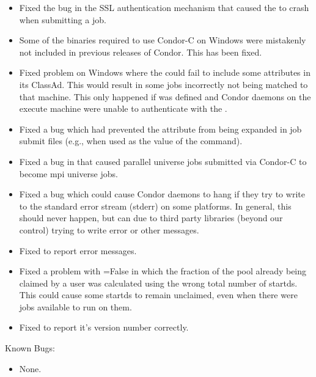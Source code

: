 \begin{itemize}
\item Fixed the bug in the SSL authentication mechanism that caused the
 to crash when submitting a job.

\item Some of the binaries required to use Condor-C on Windows were
mistakenly not included in previous releases of Condor. This has been
fixed.

\item Fixed problem on Windows where the  could fail to
include some attributes in its ClassAd. This would result in some jobs
incorrectly not being matched to that machine.  This only happened if
 was defined and Condor daemons on the execute
machine were unable to authenticate with the .

\item Fixed a  bug which had prevented the
 attribute from being expanded in job submit files
(e.g., when used as the value of the  command).

\item Fixed a bug in  that caused parallel universe jobs
submitted via Condor-C to become mpi universe jobs.

\item Fixed a bug which could cause Condor daemons to hang if they try
to write to the standard error stream (stderr) on some platforms.  In
general, this should never happen, but can due to third party
libraries (beyond our control) trying to write error or other messages.

\item Fixed  to report error messages.

\item Fixed a problem with =False
in which the fraction of the pool already being claimed by a user was
calculated using the wrong total number of startds.  This could cause
some startds to remain unclaimed, even when there were jobs available
to run on them.

\item Fixed  to report it's version number
correctly.

\end{itemize}

\noindent Known Bugs:

\begin{itemize}

\item None.

\end{itemize}




